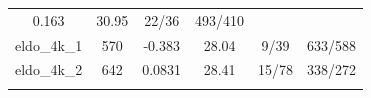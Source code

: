 \documentclass[]{article}
\begin{document}
\begin{longtable}[]{@{}cccccc@{}}
\begin{minipage}[t]{0.11\columnwidth}
0.163\strut
\end{minipage} & \begin{minipage}[t]{0.13\columnwidth}\centering\strut
30.95\strut
\end{minipage} & \begin{minipage}[t]{0.18\columnwidth}\centering\strut
22/36\strut
\end{minipage} & \begin{minipage}[t]{0.22\columnwidth}\centering\strut
493/410\strut
\end{minipage}\tabularnewline
\begin{minipage}[t]{0.11\columnwidth}\centering\strut
eldo\_4k\_1\strut
\end{minipage} & \begin{minipage}[t]{0.07\columnwidth}\centering\strut
570\strut
\end{minipage} & \begin{minipage}[t]{0.11\columnwidth}\centering\strut
-0.383\strut
\end{minipage} & \begin{minipage}[t]{0.13\columnwidth}\centering\strut
28.04\strut
\end{minipage} & \begin{minipage}[t]{0.18\columnwidth}\centering\strut
9/39\strut
\end{minipage} & \begin{minipage}[t]{0.22\columnwidth}\centering\strut
633/588\strut
\end{minipage}\tabularnewline
\begin{minipage}[t]{0.11\columnwidth}\centering\strut
eldo\_4k\_2\strut
\end{minipage} & \begin{minipage}[t]{0.07\columnwidth}\centering\strut
642\strut
\end{minipage} & \begin{minipage}[t]{0.11\columnwidth}\centering\strut
0.0831\strut
\end{minipage} & \begin{minipage}[t]{0.13\columnwidth}\centering\strut
28.41\strut
\end{minipage} & \begin{minipage}[t]{0.18\columnwidth}\centering\strut
15/78\strut
\end{minipage} & \begin{minipage}[t]{0.22\columnwidth}\centering\strut
338/272\strut
\end{minipage}\tabularnewline
\begin{minipage}[t]{0.11\columnwidth}\centering\strut

\end{minipage}
\end{longtable}
\end{document}
